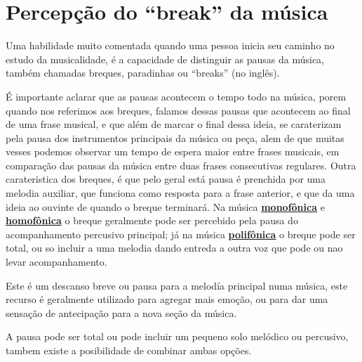 \section{Percepção do ``break'' da música}
\label{sec:percepcionbreak}

Uma habilidade muito comentada quando uma pessoa inicia seu caminho no estudo da musicalidade,
é a capacidade de distinguir as pausas da música, 
também chamadas breques, paradinhas ou ``breaks'' (no inglês).

É importante aclarar que as pausas acontecem o tempo todo na  música,
porem quando nos referimos aos breques, 
falamos dessas pausas que acontecem ao final de uma frase musical,
e que além de marcar o final dessa ideia,
se caraterizam pela pausa dos instrumentos principais da música ou peça,
alem de que muitas vesses podemos observar um tempo de espera maior entre frases musicais, 
em comparação das pausas da música entre duas frases consecutivas regulares.
Outra carateristica dos breques, 
é que pelo geral está pausa é prenchida por uma melodia auxiliar,
que funciona como resposta para a frase anterior, e que da uma ideia ao ouvinte de quando o breque terminará.
Na música \hyperref[subsec:monofonica]{\textbf{monofônica}} e \hyperref[subsec:homofonica]{\textbf{homofônica}} 
o breque geralmente pode ser percebido pela pausa do acompanhamento percusivo principal;
já na música \hyperref[subsec:polifonica]{\textbf{polifônica}} o breque pode ser total,
ou so incluir a uma melodia dando entreda a outra voz que pode ou nao levar acompanhamento.
\begin{definition}
Este é um descanso breve ou pausa para a melodía principal numa música,
este recurso é geralmente utilizado para agregar mais emoção,
ou para dar uma sensação de antecipação para a nova seção da música. 

A pausa pode ser total ou pode incluir um pequeno solo melódico ou percusivo, 
tambem existe a posibilidade de combinar ambas opções.
\end{definition}

